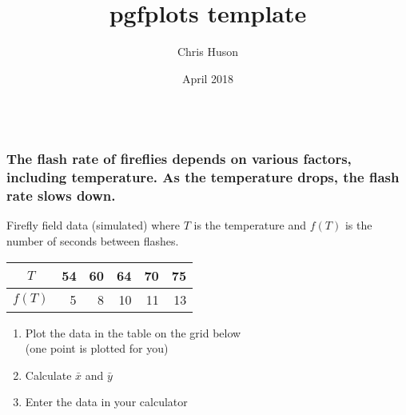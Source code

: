 \documentclass[12pt, oneside]{article}
\title{pgfplots template}
\author{Chris Huson}
\date{April 2018}
\begin{document}
\subsubsection*{\\ \textnormal{The flash rate of fireflies depends on various factors, including temperature. As the temperature drops, the flash rate slows down.
}}



Firefly field data (simulated) where $T$ is the temperature and $f(T)$ is the number of seconds between flashes. \\[10pt]
\begin{tabular}{|c|r|r|r|r|r|}
\hline 
$T$ & 54 & 60 & 64 & 70 & 75 \\ [3pt]
\hline 
$f(T)$ & 5 & 8 & 10 & 11 & 13  \\  [3pt]
\hline 
\end{tabular}
\begin{enumerate}
    \item Plot the data in the table on the grid below \\
    (one point is plotted for you)
    \item Calculate $\bar{x}$ and $\bar{y}$
    \item Enter the data in your calculator
\end{enumerate}

\vspace{1in}
{}


\end{document}

